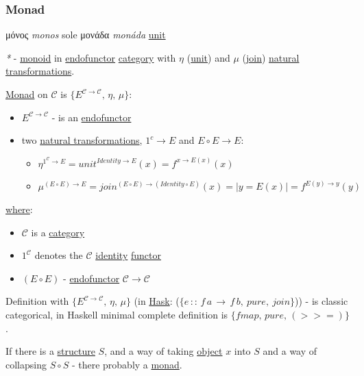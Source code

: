 \documentclass[a4paper,14pt,oneside]{book}
\begin{document}
\subsubsection{\label{org1b8b304}Monad}
\label{sec:org8061c98}
μόνος \emph{monos} sole
μονάδα \emph{monáda} \hyperref[org37e9e01]{unit}

\emph{*} - \hyperref[org9e1ff1f]{monoid} in \hyperref[org986474e]{endofunctor} \hyperref[org82baa03]{category} with \(\eta\) (\hyperref[org37e9e01]{unit}) and \(\mu\) (\hyperref[org4213b71]{join}) \hyperref[orgb5e430f]{natural transformations}.

\hyperref[org1b8b304]{Monad} on \(\mathcal{C}\) is \(\{E^{\mathcal{C \to C}}, \, \eta, \, \mu\}\):
\begin{itemize}
\item \(E^{\mathcal{C \to C}}\) - is an \hyperref[org986474e]{endofunctor}
\item two \hyperref[orgb5e430f]{natural transformations}, \(1^c \to E\) and \(E \circ E \to E\):
\begin{itemize}
\item \(\eta^{1^{\mathcal{C}} \to E} = {unit}^{Identity \to E}(x) = f^{ x \to E(x)}(x)\)
\item \(\mu^{(E \circ E) \to E} = {join}^{(E \circ E) \to (Identity \circ E)}(x) = | y = E(x) | = f^{E (y) \to y}(y)\)
\end{itemize}
\end{itemize}

\hyperref[orgbe7070f]{where}:
\begin{itemize}
\item \(\mathcal{C}\) is a \hyperref[org82baa03]{category}
\item \(1^{\mathcal{C}}\) denotes the \(\mathcal{C}\) \hyperref[org5f89edb]{identity} \hyperref[orgdd3b6fb]{functor}
\item \((E \circ E)\) - \hyperref[org986474e]{endofunctor} \(\mathcal{C \to C}\)
\end{itemize}

Definition with \(\{E^{\mathcal{C \to C}}, \, \eta, \, \mu\}\) (in \hyperref[org9b4a4d9]{Hask}: (\(\{e \, :: \, f \, a \, \to \, f \, b, \ pure, \ join\}\))) - is classic categorical, in Haskell minimal complete definition is \(\{fmap, \, pure, \, (>>=)\}\).

If there is a \hyperref[org105c77d]{structure} \(S\), and a way of taking \hyperref[org8d6cd26]{object} \(x\) into \(S\) and a way of collapsing \(S \circ S\) - there probably a \hyperref[org1b8b304]{monad}.
\end{document}
